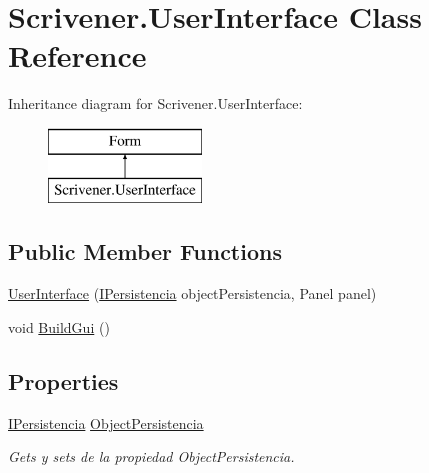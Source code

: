 \hypertarget{class_scrivener_1_1_user_interface}{\section{Scrivener.\-User\-Interface Class Reference}
\label{class_scrivener_1_1_user_interface}
}
Inheritance diagram for Scrivener.\-User\-Interface\-:\begin{figure}[H]
\begin{center}
\leavevmode
\includegraphics[height=2.000000cm]{class_scrivener_1_1_user_interface}
\end{center}
\end{figure}
\subsection*{Public Member Functions}
\begin{DoxyCompactItemize}
\item 
\hyperlink{class_scrivener_1_1_user_interface_a2530c43ebdb8eb24c279ccf4ef03f62d}{User\-Interface} (\hyperlink{interface_scrivener_1_1_i_persistencia}{I\-Persistencia} object\-Persistencia, Panel panel)
\item 
void \hyperlink{class_scrivener_1_1_user_interface_a50dc5329e3dab19828d1007bdaafdb45}{Build\-Gui} ()
\end{DoxyCompactItemize}
\subsection*{Properties}
\begin{DoxyCompactItemize}
\item 
\hyperlink{interface_scrivener_1_1_i_persistencia}{I\-Persistencia} \hyperlink{class_scrivener_1_1_user_interface_a4029948a0c4bb3d5c6407872ac9ea878}{Object\-Persistencia}
\begin{DoxyCompactList}\small\item\em Gets y sets de la propiedad Object\-Persistencia. \end{DoxyCompactList}\end{DoxyCompactItemize}


